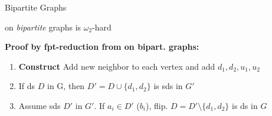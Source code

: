 \begin{frame}[c]{Bipartite Graphs}

    \begin{tcolorbox}[colback=TUMBlueLighter]
        \sdom on \textit{bipartite} graphs is $\omega_2$-hard
    \end{tcolorbox}

    \begin{figure}[!ht]
    \end{figure}

    \textbf{Proof by fpt-reduction from \pdom on bipart. graphs:}

    \begin{enumerate}
     \pause   \item \textbf{Construct } Add new neighbor to each vertex and add $d_1,d_2,u_1,u_2$
     \pause   \item If ds $D$ in G, then $D' = D \cup \{d_1,d_2\}$ is sds in $G'$
     \pause   \item Assume sds $D'$ in $G'$. If $a_i \in D'$ ($b_i$), flip. $D = D' \setminus \{d_1,d_2\}$ is ds in $G$
    \end{enumerate}

    \end{frame}



